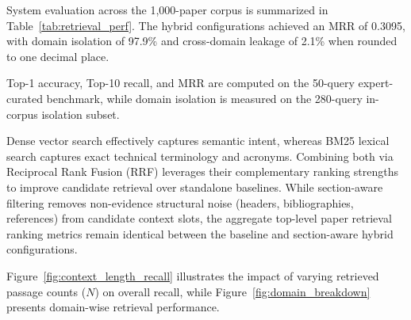 \documentclass[conference]{IEEEtran}
\begin{document}
System evaluation across the 1,000-paper corpus is summarized in Table~\ref{tab:retrieval_perf}. The hybrid configurations achieved an MRR of 0.3095, with domain isolation of 97.9\% and cross-domain leakage of 2.1\% when rounded to one decimal place.

Top-1 accuracy, Top-10 recall, and MRR are computed on the 50-query expert-curated benchmark, while domain isolation is measured on the 280-query in-corpus isolation subset.

\begin{table}[htbp]
\caption{Retrieval Performance Comparison Across Configurations}
\label{tab:retrieval_perf}
\centering
{}
\end{table}

Dense vector search effectively captures semantic intent, whereas BM25 lexical search captures exact technical terminology and acronyms. Combining both via Reciprocal Rank Fusion (RRF) leverages their complementary ranking strengths to improve candidate retrieval over standalone baselines. While section-aware filtering removes non-evidence structural noise (headers, bibliographies, references) from candidate context slots, the aggregate top-level paper retrieval ranking metrics remain identical between the baseline and section-aware hybrid configurations.

Figure~\ref{fig:context_length_recall} illustrates the impact of varying retrieved passage counts ($N$) on overall recall, while Figure~\ref{fig:domain_breakdown} presents domain-wise retrieval performance.
\end{document}
